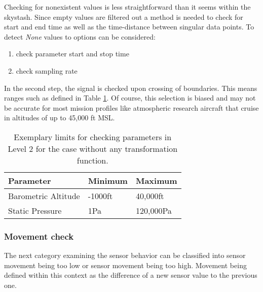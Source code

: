 Checking for nonexistent values is less straightforward than it seems within the skystash. Since empty values are filtered out a method is needed to check for start and end time as well as the time-distance between singular data points. To detect \textit{None} values to options can be considered:
\begin{enumerate}
    \item check parameter start and stop time
    \item check sampling rate
\end{enumerate}
In the second step, the signal is checked upon crossing of boundaries. This means ranges such as defined in Table \ref{tab:level_2_range}. Of course, this selection is biased and may not be accurate for most mission profiles like atmospheric research aircraft that cruise in altitudes of up to 45,000 ft MSL.

\begin{table}[]
    \centering
    \caption[Exemplary limits for checking parameters in Level 2]{Exemplary limits for checking parameters in Level 2 for the case without any transformation function.}
    \begin{tabular}{@{}lll@{}}
        \toprule
        Parameter           & Minimum & Maximum   \\ \midrule
        Barometric Altitude & -1000ft & 40,000ft  \\
        Static Pressure     & 1Pa     & 120,000Pa \\ \bottomrule
    \end{tabular}
    \label{tab:level_2_range}
\end{table}

\subsubsection{Movement check}
\label{chap:4-level_2_movement}
The next category examining the sensor behavior can be classified into sensor movement being too low or sensor movement being too high. Movement being defined within this context as the difference of a new sensor value to the previous one.

